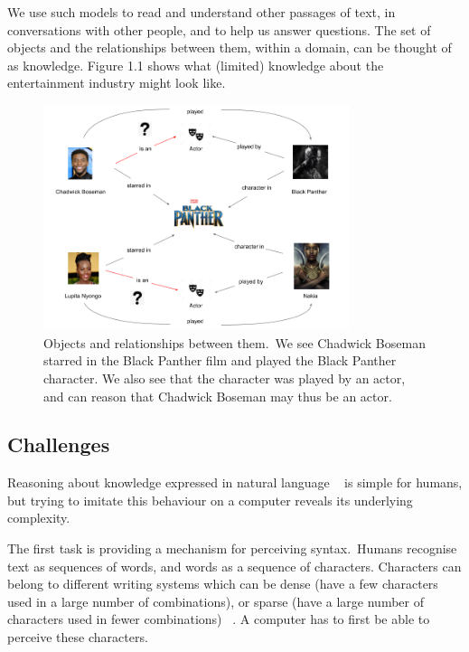 \noindent We use such models to read and understand other passages of text, in conversations with other people, and to help us answer questions. The set of objects and the relationships between them, within a domain, can be thought of as knowledge. Figure 1.1 shows what (limited) knowledge about the entertainment industry might look like. 

\begin{figure} [H]
   	\centering
    	\includegraphics[width=0.8\textwidth, height=0.4\textheight]{Entities_and_the_Relationships_Between_Them}
	\captionsetup{justification=centering}
	\caption{Objects and relationships between them.\ We see Chadwick Boseman starred in the Black Panther film and played the Black Panther character. We also see that the character was played by an actor, and can reason that Chadwick Boseman may thus be an actor.}
\end{figure}

\subsection{Challenges} 

Reasoning about knowledge expressed in natural language \unskip~\citep{minervini2019differentiable} is simple for humans, but trying to imitate this behaviour on a computer reveals its underlying complexity. \par

\noindent The first task is providing a mechanism for perceiving syntax.\ Humans recognise text as sequences of words, and words as a sequence of characters. Characters can belong to different writing systems which can be dense (have a few characters used in a large number of combinations), or sparse (have a large number of characters used in fewer combinations) \unskip~\citep{Hua2010}. A computer has to first be able to perceive these characters. \par


